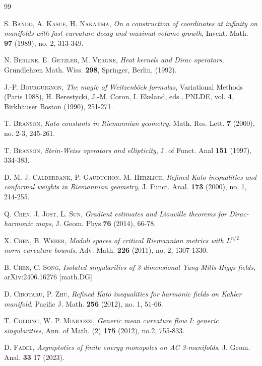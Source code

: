 \documentclass[12pt]{amsart} %
\theoremstyle{definition}
\numberwithin{equation}{section}
\begin{document}

\begin{thebibliography}{99}


\textsc{S. Bando, A. Kasue, H. Nakajima}, \emph{On a construction
of coordinates at infinity on manifolds with fast curvature decay
and maximal volume growth}, Invent. Math. {\bf 97} (1989), no. 2, 313-349.

\textsc{N. Berline, E. Getzler, M. Vergne}, \emph{Heat kernels and Dirac operators},
Grundlehren  Math.  Wiss. {\bf 298}, Springer, Berlin, (1992).

 \textsc{J.-P. Bourguignon}, \emph{The magic of Weitzenb\"ock formulas}, Variational Methods (Paris 1988), H. Berestycki,
J.-M. Coron, I. Ekeland, eds., PNLDE, vol. {\bf 4}, Birkh\"auser Boston (1990), 251-271.

 \textsc{T. Branson}, \emph{Kato constants in Riemannian geometry},
Math. Res. Lett. {\bf 7} (2000), no. 2-3, 245-261.

\textsc{T. Branson}, \emph{Stein-Weiss operators and ellipticity}, J. of Funct. Anal {\bf 151} (1997), 334-383. 

\textsc{D. M. J. Calderbank, P. Gauduchon, M. Herzlich},
\emph{Refined Kato inequalities and conformal weights in Riemannian geometry},
J. Funct. Anal. {\bf 173} (2000), no. 1, 214-255.

 \textsc{Q. Chen, J. Jost, L. Sun}, \emph{Gradient estimates and
Liouville theorems for Dirac-harmonic maps}, J. Geom. Phys.{\bf 76} (2014),
66-78.

 \textsc{X. Chen, B. Weber}, \emph{Moduli spaces of critical Riemannian
metrics with $L^{n/2}$ norm curvature bounds}, Adv. Math. {\bf 226} (2011), no.
2, 1307-1330.

 \textsc{B. Chen, C. Song}, \emph{Isolated singularities of 3-dimensional Yang-Mills-Higgs fields}, arXiv:2406.16276 [math.DG]

 \textsc{D. Cibotaru, P. Zhu}, \emph{Refined Kato inequalities for
harmonic fields on Kahler manifold}, Pacific J. Math. {\bf 256} (2012),
no. 1, 51-66.

\textsc{T. Colding, W. P. Minicozzi}, \emph{Generic mean curvature
flow I: generic singularities}, Ann. of Math. (2) {\bf 175} (2012), no.2, 755-833.

 \textsc{D. Fadel}, \emph{Asymptotics of finite energy monopoles on
AC 3-manifolds}, J. Geom. Anal. {\bf 33} 17 (2023).


\end{thebibliography}
\end{document}
